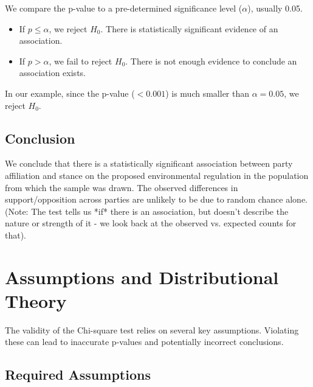 \documentclass{article}
\begin{document}
We compare the p-value to a pre-determined significance level ($\alpha$), usually 0.05.
\begin{itemize}
    \item If $p \le \alpha$, we reject $H_0$. There is statistically significant evidence of an association.
    \item If $p > \alpha$, we fail to reject $H_0$. There is not enough evidence to conclude an association exists.
\end{itemize}

In our example, since the p-value ($< 0.001$) is much smaller than $\alpha = 0.05$, we reject $H_0$.

\subsection{Conclusion}
We conclude that there is a statistically significant association between party affiliation and stance on the proposed environmental regulation in the population from which the sample was drawn. The observed differences in support/opposition across parties are unlikely to be due to random chance alone. (Note: The test tells us *if* there is an association, but doesn't describe the nature or strength of it - we look back at the observed vs. expected counts for that).

\section{Assumptions and Distributional Theory}

The validity of the Chi-square test relies on several key assumptions. Violating these can lead to inaccurate p-values and potentially incorrect conclusions.

\subsection{Required Assumptions}
\end{document}
